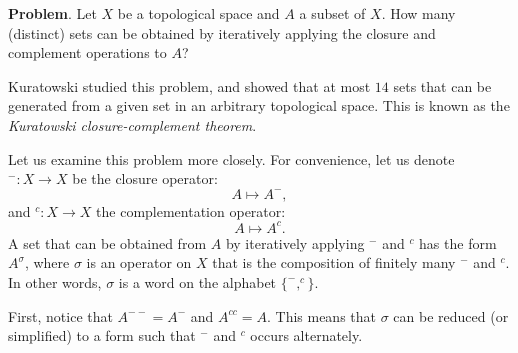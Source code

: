 \documentclass[12pt]{article}
\begin{document}
\textbf{Problem}.  Let $X$ be a topological space and $A$ a subset of $X$.  How many (distinct) sets can be obtained by iteratively applying the closure and complement operations to $A$?

Kuratowski studied this problem, and showed that at most $14$ sets that can be generated from a given set in an arbitrary topological space.  This is known as the \emph{Kuratowski closure-complement theorem}.

Let us examine this problem more closely.  For convenience, let us denote $^-:X\to X$ be the closure operator: $$A\mapsto A^-,$$ and $^c:X\to X$ the complementation operator: $$A \mapsto A^c.$$  A set that can be obtained from $A$ by iteratively applying $^-$ and $^c$ has the form $A^\sigma$, where $\sigma$ is an operator on $X$ that is the composition of finitely many $^-$ and $^c$.  In other words, $\sigma$ is a word on the alphabet $\lbrace ^-, ^c\rbrace$.

First, notice that $A^{--}=A^{-}$ and $A^{cc}=A$.   This means that $\sigma$ can be reduced (or simplified) to a form such that $^-$ and $^c$ occurs alternately.
\end{document}
